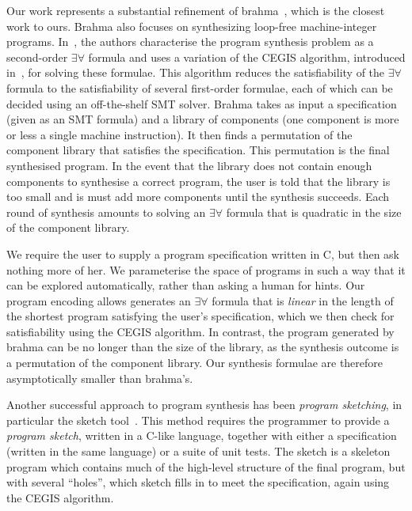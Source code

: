 \documentclass[a4paper]{llncs}
\begin{document}
Our work represents a substantial refinement of {\sc brahma}~\cite{brahma},
which is the closest work to ours.  {\sc Brahma} also focuses on
synthesizing loop-free machine-integer programs.  In~\cite{brahma}, the
authors characterise the program synthesis problem as a second-order
$\exists \forall$ formula and uses a variation of the CEGIS algorithm,
introduced in~\cite{lezama-thesis}, for solving
these formulae.  This algorithm reduces the satisfiability of the $\exists
\forall$ formula to the satisfiability of several first-order formulae, each
of which can be decided using an off-the-shelf SMT solver.  {\sc Brahma}
takes as input a specification (given as an SMT formula) and a library of
components (one component is more or less a single machine instruction).  It
then finds a permutation of the component library that satisfies the
specification.  This permutation is the final synthesised program.  In the
event that the library does not contain enough components to synthesise a
correct program, the user is told that the library is too small and is
must add more components until the synthesis succeeds.  Each round of
synthesis amounts to solving an $\exists \forall$ formula that is quadratic
in the size of the component library.

We require the user to supply a program specification written in C, but then
ask nothing more of her.  We parameterise the space of programs in such a way
that it can be explored automatically, rather than asking a human for hints.
Our program encoding allows generates an $\exists
\forall$ formula that is \emph{linear} in the length of the shortest program
satisfying the user's specification, which we then check for satisfiability
using the CEGIS algorithm.  In contrast, the program generated by {\sc
brahma} can be no longer than the size of the library, as the synthesis
outcome is a permutation of the component library.  Our synthesis
formulae are therefore asymptotically smaller than {\sc brahma}'s.

Another successful approach to program synthesis has been \emph{program
sketching}, in particular the {\sc sketch} tool~\cite{lezama-thesis,sketch}.  This method
requires the programmer to provide a \emph{program sketch}, written in a
C-like language, together with either a specification (written in the same
language) or a suite of unit tests.  The sketch is a skeleton program which
contains much of the high-level structure of the final program, but with
several ``holes'', which {\sc sketch} fills in to meet the specification,
again using the CEGIS algorithm.
\end{document}
